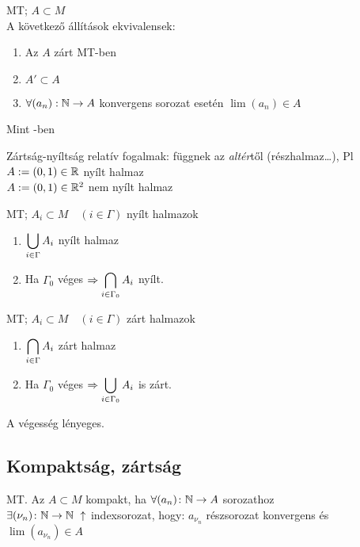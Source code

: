 \begin{te}\MT MT; $A\subset M$\\
  A következő állítások ekvivalensek:%
  \begin{enumerate}
  \item Az $A$ zárt \MT MT-ben
  \item $A'\subset A$
  \item $\forall (a_n):\mathbb{N}\to A$ konvergens sorozat esetén
    $\lim(a_n)\in A$  
  \end{enumerate}
\end{te}
\begin{biz} Mint \R-ben
\end{biz}

\begin{megj}
  Zártság-nyíltság relatív fogalmak: függnek az \emph{altér}től
  (részhalmaz\ldots), Pl\
  $A := (0,1) \in \mathbb{R}$ nyílt halmaz\\
  $A := (0,1) \in \mathbb{R}^2$ nem nyílt halmaz\\
\end{megj}

\begin{te}
  \MT MT; $A_i\subset M\quad (i\in\Gamma)$ nyílt halmazok
  \begin{enumerate}
  \item $\displaystyle\bigcup_{i\in\Gamma} A_i$ nyílt halmaz
  \item Ha $\Gamma_0$ véges $\Rightarrow \displaystyle\bigcap_{i\in\Gamma_0} A_i$ nyílt.
  \end{enumerate}
\end{te}

\begin{te}
  \MT MT; $A_i\subset M\quad (i\in\Gamma)$ zárt halmazok
  \begin{enumerate}
  \item $\displaystyle\bigcap_{i\in\Gamma} A_i$ zárt halmaz
  \item Ha $\Gamma_0$ véges $\Rightarrow \displaystyle\bigcup_{i\in\Gamma_0} A_i$ is
    zárt.
  \end{enumerate}
\end{te}

\begin{megj}A végesség lényeges.
\end{megj}
\subsection{Kompaktság, zártság}

\begin{de}\MT MT. Az $A\subset M$ kompakt, ha $\forall (a_n)\colon
  \mathbb{N}\to A$ sorozathoz\\ $\exists (\nu_n)\colon \N\n\N\ \uparrow$
  indexsorozat, hogy: $a_{\nu_n}$ részsorozat konvergens és
  $\lim(a_{\nu_n})\in A$
\end{de}

